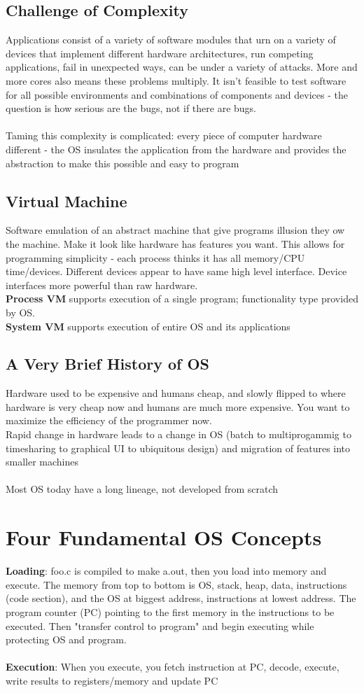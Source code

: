 \documentclass{article}
\begin{document}
\subsection{Challenge of Complexity}
Applications consist of a variety of software modules that urn on a variety of devices that implement different hardware architectures, run competing applications, fail in unexpected ways, can be under a variety of attacks. More and more cores also means these problems multiply. It isn't feasible to test software for all possible environments and combinations of components and devices - the question is how serious are the bugs, not if there are bugs. \\ \\
Taming this complexity is complicated: every piece of computer hardware different - the OS insulates the application from the hardware and provides the abstraction to make this possible and easy to program
\subsection{Virtual Machine} Software emulation of an abstract machine that give programs illusion they ow the machine. Make it look like hardware has features you want.  This allows for programming simplicity - each process thinks it has all memory/CPU time/devices. Different devices appear to have same high level interface. Device interfaces more powerful than raw hardware.\\ 
\textbf{Process VM} supports execution of a single program; functionality type provided by OS. \\
\textbf{System VM} supports execution of entire OS and its applications 
\subsection{A Very Brief History of OS}
Hardware used to be expensive and humans cheap, and slowly flipped to where hardware is very cheap now and humans are much more expensive. You want to maximize the efficiency of the programmer now. \\
Rapid change in hardware leads to a change in OS (batch to multiprogammig to timesharing to graphical UI to ubiquitous design) and migration of features into smaller machines \\ \\
Most OS today have a long lineage, not developed from scratch
\section{Four Fundamental OS Concepts}
\textbf{Loading}: foo.c is compiled to make a.out, then you load into memory and execute. The memory from top to bottom is OS, stack, heap, data, instructions (code section), and the OS at biggest address, instructions at lowest address. The program counter (PC) pointing to the first memory in the instructions to be executed. Then "transfer control to program" and begin executing while protecting OS and program. \\ \\
\textbf{Execution}: When you execute, you fetch instruction at PC, decode, execute, write results to registers/memory and update PC
\end{document}
